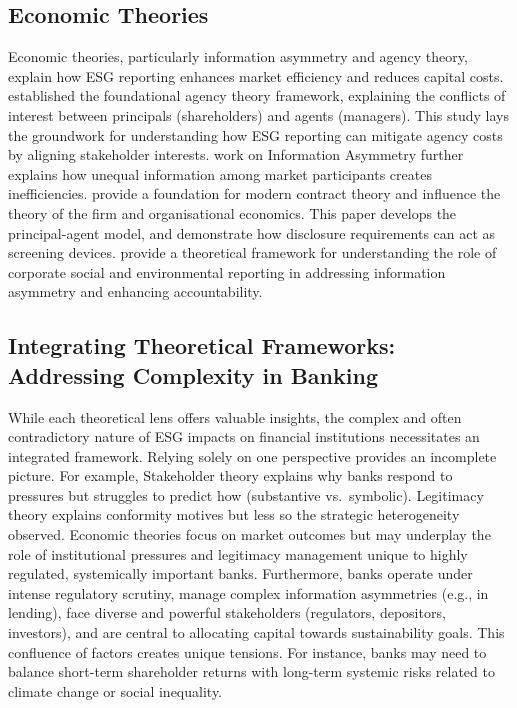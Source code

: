 \documentclass[
  authoryear]{elsarticle}
\begin{document}
\subsection{Economic Theories}\label{economic-theories}

Economic theories, particularly information asymmetry and agency theory,
explain how ESG reporting enhances market efficiency and reduces capital
costs. \citet{JENSEN1976} established the foundational agency theory
framework, explaining the conflicts of interest between principals
(shareholders) and agents (managers). This study lays the groundwork for
understanding how ESG reporting can mitigate agency costs by aligning
stakeholder interests. \citet{AKERLOF1970} work on Information Asymmetry
further explains how unequal information among market participants
creates inefficiencies. \citet{HART1987} provide a foundation for modern
contract theory and influence the theory of the firm and organisational
economics. This paper develops the principal-agent model, and
demonstrate how disclosure requirements can act as screening devices.
\citet{GRAY1996} provide a theoretical framework for understanding the
role of corporate social and environmental reporting in addressing
information asymmetry and enhancing accountability.

\subsection{Integrating Theoretical Frameworks: Addressing Complexity in
Banking}\label{integrating-theoretical-frameworks-addressing-complexity-in-banking}

While each theoretical lens offers valuable insights, the complex and
often contradictory nature of ESG impacts on financial institutions
necessitates an integrated framework. Relying solely on one perspective
provides an incomplete picture. For example, Stakeholder theory explains
why banks respond to pressures but struggles to predict how (substantive
vs.~symbolic). Legitimacy theory explains conformity motives but less so
the strategic heterogeneity observed. Economic theories focus on market
outcomes but may underplay the role of institutional pressures and
legitimacy management unique to highly regulated, systemically important
banks. Furthermore, banks operate under intense regulatory scrutiny,
manage complex information asymmetries (e.g., in lending), face diverse
and powerful stakeholders (regulators, depositors, investors), and are
central to allocating capital towards sustainability goals. This
confluence of factors creates unique tensions. For instance, banks may
need to balance short-term shareholder returns with long-term systemic
risks related to climate change or social inequality.
\end{document}
